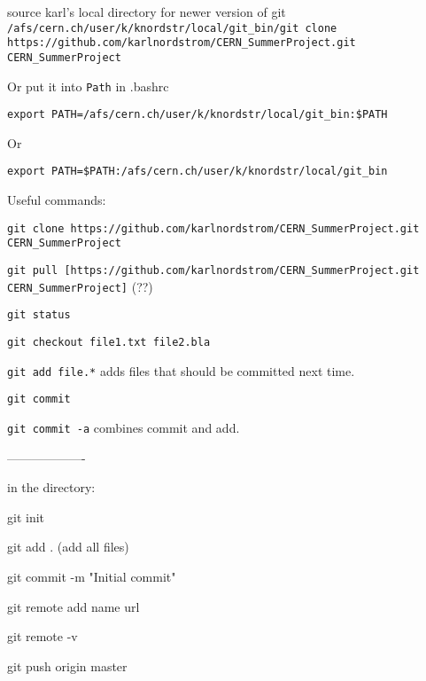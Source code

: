 source karl's local directory for newer version of git
\lstinline|/afs/cern.ch/user/k/knordstr/local/git_bin/git clone https://github.com/karlnordstrom/CERN_SummerProject.git CERN_SummerProject|

Or put it into \lstinline|Path| in .bashrc

\lstinline|export PATH=/afs/cern.ch/user/k/knordstr/local/git_bin:$PATH|

Or

\lstinline|export PATH=$PATH:/afs/cern.ch/user/k/knordstr/local/git_bin|

Useful commands:

\lstinline|git clone https://github.com/karlnordstrom/CERN_SummerProject.git CERN_SummerProject|

\lstinline|git pull [https://github.com/karlnordstrom/CERN_SummerProject.git CERN_SummerProject]| (??)

\lstinline|git status|

\lstinline|git checkout file1.txt file2.bla|

\lstinline|git add file.*| adds files that should be committed next time.

\lstinline|git commit|

\lstinline|git commit -a| combines commit and add.


-------------------

in the directory:

git init

git add . (add all files)

git commit -m "Initial commit"

git remote add name url

git remote -v

git push origin master